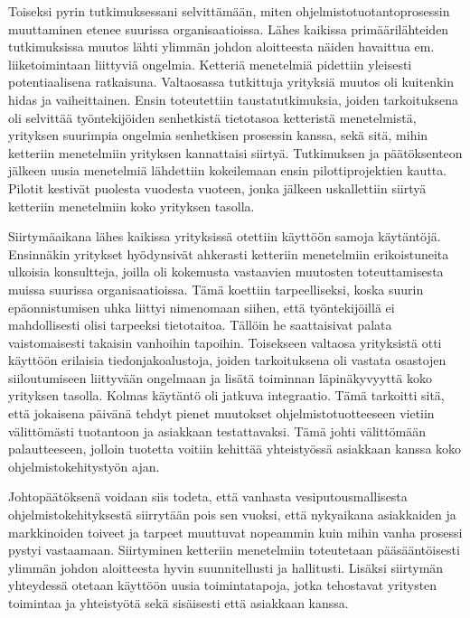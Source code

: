 \documentclass[12pt]{article}
\begin{document}
Toiseksi pyrin tutkimuksessani selvittämään, miten
ohjelmistotuotantoprosessin muuttaminen etenee suurissa
organisaatioissa. Lähes kaikissa primäärilähteiden tutkimuksissa
muutos lähti ylimmän johdon aloitteesta näiden havaittua em{.}
liiketoimintaan liittyviä ongelmia. Ketteriä menetelmiä pidettiin
yleisesti potentiaalisena ratkaisuna. Valtaosassa tutkittuja yrityksiä
muutos oli kuitenkin hidas ja vaiheittainen. Ensin toteutettiin
taustatutkimuksia, joiden tarkoituksena oli selvittää työntekijöiden
senhetkistä tietotasoa ketteristä menetelmistä, yrityksen
suurimpia ongelmia senhetkisen prosessin kanssa, sekä sitä, mihin
ketteriin menetelmiin yrityksen kannattaisi siirtyä. Tutkimuksen ja
päätöksenteon jälkeen uusia menetelmiä lähdettiin kokeilemaan
ensin pilottiprojektien kautta. Pilotit kestivät puolesta vuodesta
vuoteen, jonka jälkeen uskallettiin siirtyä ketteriin menetelmiin koko
yrityksen tasolla.

Siirtymäaikana lähes kaikissa yrityksissä otettiin käyttöön
samoja käytäntöjä. Ensinnäkin yritykset hyödynsivät ahkerasti
ketteriin menetelmiin erikoistuneita ulkoisia konsultteja, joilla
oli kokemusta vastaavien muutosten toteuttamisesta muissa suurissa
organisaatioissa. Tämä koettiin tarpeelliseksi, koska suurin
epäonnistumisen uhka liittyi nimenomaan siihen, että työntekijöillä
ei mahdollisesti olisi tarpeeksi tietotaitoa. Tällöin he saattaisivat
palata vaistomaisesti takaisin vanhoihin tapoihin. Toisekseen valtaosa
yrityksistä otti käyttöön erilaisia tiedonjakoalustoja, joiden
tarkoituksena oli vastata osastojen siiloutumiseen liittyvään
ongelmaan ja lisätä toiminnan läpinäkyvyyttä koko yrityksen
tasolla. Kolmas käytäntö oli jatkuva integraatio. Tämä
tarkoitti sitä, että jokaisena päivänä tehdyt pienet muutokset
ohjelmistotuotteeseen vietiin välittömästi tuotantoon ja asiakkaan
testattavaksi. Tämä johti välittömään palautteeseen, jolloin
tuotetta voitiin kehittää yhteistyössä asiakkaan kanssa koko
ohjelmistokehitystyön ajan.

Johtopäätöksenä voidaan siis todeta, että vanhasta
vesiputousmallisesta ohjelmistokehityksestä siirrytään pois sen
vuoksi, että nykyaikana asiakkaiden ja markkinoiden toiveet ja tarpeet
muuttuvat nopeammin kuin mihin vanha prosessi pystyi vastaamaan.
Siirtyminen ketteriin menetelmiin toteutetaan pääsääntöisesti
ylimmän johdon aloitteesta hyvin suunnitellusti ja hallitusti. Lisäksi
siirtymän yhteydessä otetaan käyttöön uusia toimintatapoja, jotka
tehostavat yritysten toimintaa ja yhteistyötä sekä sisäisesti että
asiakkaan kanssa.
\end{document}
